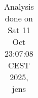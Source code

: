\begin{table}[h]
\begin{center}
\begin{tabular}{|l|c|c|c|c|}
\hline
\hline
\end{tabular}
\end{center}
\caption{ Analysis done on Sat 11 Oct 23:07:08 CEST 2025, jens}
\end{table}
